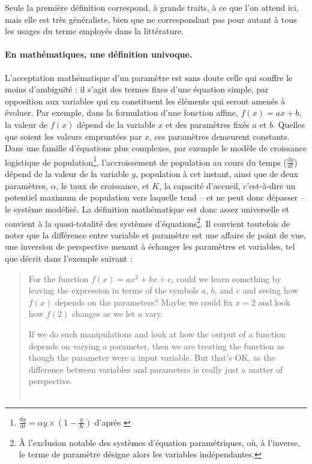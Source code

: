 Seule la première définition correspond, à grands traits, à ce que l'on attend ici, mais elle est très généraliste, bien que ne correspondant pas pour autant à tous les usages du terme employés dans la littérature.

\paragraph{En mathématiques, une définition univoque.}

L'acceptation mathématique d'un paramètre est sans doute celle qui souffre le moins d'ambiguïté : il s'agit des termes fixes d'une équation simple, par opposition aux variables qui en constituent les éléments qui seront amenés à évoluer.
Par exemple, dans la formulation d'une fonction affine, $f(x) = ax + b$, la valeur de $f(x)$ dépend de la variable $x$ et des paramètres fixés $a$ et $b$.
Quelles que soient les valeurs empruntées par $x$, ces paramètres demeurent constants.
Dans une famille d'équations plus complexes, par exemple le modèle de croissance logistique de population\footnote{
	$\frac{\text{d}y}{\text{d}t} = \alpha y \times (1 - \frac{y}{K})$ d'après \autocite{verhulst1838notice}
}, l'accroissement de population au cours du temps ($\frac{\text{d}y}{\text{d}t}$) dépend de la valeur de la variable $y$, population à cet instant, ainsi que de deux paramètres, $\alpha$, le taux de croissance, et $K$, la \og capacité d'accueil\fg{}, c'est-à-dire un potentiel maximum de population vers laquelle tend -- et ne peut donc dépasser -- le système modélisé.
La définition mathématique est donc assez universelle et convient à la quasi-totalité des systèmes d'équations\footnote{
	À l'exclusion notable des systèmes d'équation paramétriques, où, à l'inverse, le terme de paramètre désigne alors les variables indépendantes.
}.
Il convient toutefois de noter que la différence entre variable et paramètre est une affaire de point de vue, une inversion de perspective menant à échanger les paramètres et variables, tel que décrit dans l'exemple suivant :
\begin{quotation}
	\noindent \og
	For the function $f(x)=ax^2+bx+c$, could we learn something by leaving the expression in terms of the symbols $a$, $b$, and $c$ and seeing how $f(x)$ depends on the parameters?
	Maybe we could fix $x=2$ and look how $f(2)$ changes as we let $a$ vary.
	
	\noindent If we do such manipulations and look at how the output of a function depends on varying a parameter, then we are treating the function as though the parameter were a input variable.
	But that's OK, as the difference between variables and parameters is really just a matter of perspective.
	\fg{}\\
	\mbox{}~ \hfill \autocite{nykamp_function_2015}
\end{quotation}
